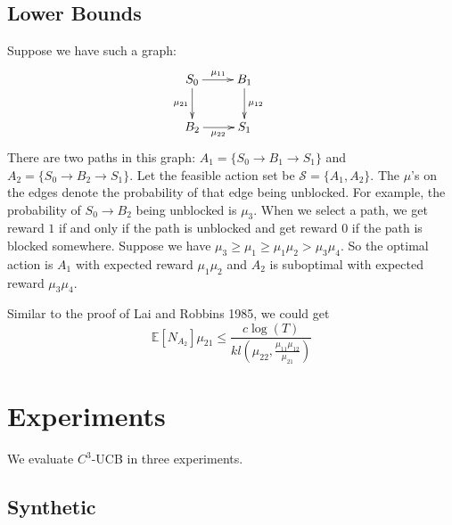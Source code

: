 \documentclass{article}
\newcommand{\EE}{\mathbb{E}}
\newcommand{\cS}{\mathcal{S}}
\begin{document}
\subsection{Lower Bounds}

Suppose we have such a graph: 
$$
  \xymatrix{
  	S_0 \ar[r]^{\mu_{11}} \ar[d]_{\mu_{21}} & B_1 \ar[d]^{\mu_{12}} &\\
  	B_2 \ar[r]_{\mu_{22}} & S_1
  }
$$
There are two paths in this graph: $A_1 = \{S_0 \to B_1 \to S_1\}$ and $A_2 = \{S_0 \to B_2 \to S_1\}$. 
Let the feasible action set be $\cS = \{A_1, A_2\}.$ The $\mu$'s on the edges denote the probability of that edge being unblocked. 
For example, the probability of $S_0 \to B_2$ being unblocked is $\mu_3$. 
When we select a path, we get reward $1$ if and only if the path is unblocked and get reward $0$ if the path is blocked somewhere. 
Suppose we have $\mu_3 \geq \mu_1 \geq \mu_1\mu_2 > \mu_3 \mu_4$.
So the optimal action is $A_1$ with expected reward $\mu_1 \mu_2$ and $A_2$ is suboptimal with expected reward $\mu_3 \mu_4$.

Similar to the proof of Lai and Robbins 1985, we could get
$$
	\EE[N_{A_2}]\mu_{21} \leq \frac{c \log(T)}{kl(\mu_{22}, \frac{\mu_{11}\mu_{12}}{\mu_{21}})}
$$


\section{Experiments}

We evaluate $C^3$-UCB in three experiments.

\subsection{Synthetic}
\end{document}
